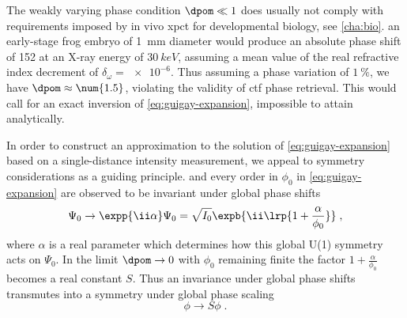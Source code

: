 \documentclass[
twoside,
openright,
titlepage,
numbers=noenddot,
headinclude,
fleqn,
a4paper,
footinclude=true,
cleardoublepage=empty,
abstractoff,
BCOR=5mm,
paper=a4,
fontsize=11pt,
british,ngerman,american,
]{scrreprt}
\begin{document}
The weakly varying phase condition $\dpom\ll1$ does usually not comply
with requirements imposed by in vivo \acf{xpct} for developmental
biology, see \cref{cha:bio}.  \Eg{} an early-stage frog embryo of
\SI{1}{mm} diameter would produce an absolute phase shift of 152 at an
X-ray energy of $\SI{30}{keV}$, assuming a mean value of the real
refractive index decrement of $\delta_\omega=\num{e-6}$.  Thus
assuming a phase variation of $\SI{1}{\percent}$, we have
$\dpom\approx\num{1.5}$, violating the validity of \ac{ctf} phase
retrieval.  This would call for an exact inversion of
\cref{eq:guigay-expansion}, impossible to attain analytically.

In order to construct an approximation to the solution of
\cref{eq:guigay-expansion} based on a single-distance intensity
measurement, we appeal to symmetry considerations as a guiding
principle.   and every order in $\phi_0$ in
\cref{eq:guigay-expansion} are observed to be invariant under global
phase shifts 
\begin{equation}
  \label{eq:global-phase-shift-u1}
  \Psi_0\to\expp{\ii\alpha}\Psi_0
  = \sqrt{I_0} \expb{\ii\lrp{1+\frac{\alpha}{\phi_0}}} \;,
\end{equation}
where $\alpha$ is a real parameter which determines how this global
U(1) symmetry acts on $\Psi_0$.  In the limit $\dpom\to0$ with
$\phi_0$ remaining finite the factor ${1+\frac{\alpha}{\phi_0}}$
becomes a real constant $S$.  Thus an invariance under global phase
shifts  transmutes into a symmetry under global phase scaling
\begin{equation}
  \label{eq:upscaling}
   \phi\to S\phi \;.
\end{equation}
\end{document}

